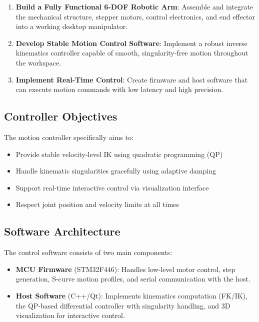 \documentclass[12pt,a4paper]{report}
\begin{document}
\begin{enumerate}
    \item \textbf{Build a Fully Functional 6-DOF Robotic Arm}: Assemble and integrate the mechanical structure, stepper motors, control electronics, and end effector into a working desktop manipulator.
    
    \item \textbf{Develop Stable Motion Control Software}: Implement a robust inverse kinematics controller capable of smooth, singularity-free motion throughout the workspace.
    
    \item \textbf{Implement Real-Time Control}: Create firmware and host software that can execute motion commands with low latency and high precision.
\end{enumerate}

\subsection{Controller Objectives}

The motion controller specifically aims to:
\begin{itemize}
    \item Provide stable velocity-level IK using quadratic programming (QP)
    \item Handle kinematic singularities gracefully using adaptive damping
    \item Support real-time interactive control via visualization interface
    \item Respect joint position and velocity limits at all times
\end{itemize}

\subsection{Software Architecture}

The control software consists of two main components:

\begin{itemize}
    \item \textbf{MCU Firmware} (STM32F446): Handles low-level motor control, step generation, S-curve motion profiles, and serial communication with the host.
    
    \item \textbf{Host Software} (C++/Qt): Implements kinematics computation (FK/IK), the QP-based differential controller with singularity handling, and 3D visualization for interactive control.
\end{itemize}
\end{document}
